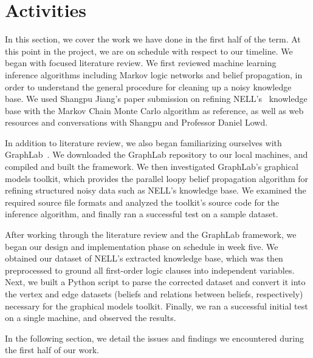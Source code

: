 \section{Activities}
In this section, we cover the work we have done in the first half of the term.
At this point in the project, we are on schedule with respect to our timeline.
We began with focused literature review.
We first reviewed machine learning inference algorithms including Markov logic networks
and belief propagation, in order to understand the general procedure for cleaning
up a noisy knowledge base.
We used Shangpu Jiang's paper submission on refining NELL's~\cite{carlson2010toward} knowledge base with the Markov Chain Monte Carlo algorithm as reference,
as well as web resources and conversations with Shangpu and Professor Daniel Lowd.

In addition to literature review, we also began familiarizing ourselves with GraphLab~\cite{low2010graphlab}.
We downloaded the GraphLab repository to our local machines, and compiled and built the framework.
We then investigated GraphLab's graphical models toolkit, 
which provides the parallel loopy belief propagation algorithm for refining structured noisy data such as NELL's knowledge base.
We examined the required source file formats and analyzed the toolkit's source code for the inference algorithm,
and finally ran a successful test on a sample dataset.

After working through the literature review and the GraphLab framework,
we began our design and implementation phase on schedule in week five.
We obtained our dataset of NELL's extracted knowledge base,
which was then preprocessed to ground all first-order logic clauses
into independent variables.
Next, we built a Python script to parse the corrected dataset
and convert it into the vertex and edge datasets (beliefs and relations between beliefs, respectively) necessary for the graphical models toolkit.
Finally, we ran a successful initial test on a single machine, and observed the results.

In the following section, we detail the issues and findings we encountered during the first half of our work.

